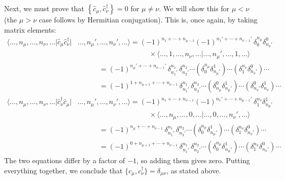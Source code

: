 \documentclass[pra,12pt]{revtex4}
\begin{document}
Next, we must prove that $\left\{ \hat{c}_\mu,
\hat{c}_\nu^\dagger\right\} = 0$ for $\mu \ne \nu$.  We will show this
for $\mu < \nu$ (the $\mu > \nu$ case follows by Hermitian
conjugation).  This is, once again, by taking matrix elements:
$$\begin{aligned}\big\langle \dots,n_\mu,\dots, n_\nu,\dots \big| \hat{c}_\mu \hat{c}_\nu^\dagger \big| & \dots, n_\mu', \dots, n_\nu',\dots\big\rangle = (-1)^{n_1+\cdots+n_{\mu-1}} (-1)^{n_1'+\cdots+n_{\nu-1}'} \,\delta^{n_\mu}_0 \delta^0_{n_\nu'} \\ &\qquad\qquad\qquad\qquad\qquad\times \big\langle \dots, 1, \dots, n_\nu,\dots\big| \dots,n_{\mu}', \dots,1, \dots \big\rangle \\ &\qquad\quad = (-1)^{n_\mu'+\cdots+n_{\nu-1}'}\, \delta^{n_1}_{n_1'} \, \delta^{n_2}_{n_2'} \cdots \left(\delta^{n_\mu}_0\delta^1_{n_\mu'}\right) \cdots \left(\delta^{n_\nu}_1 \delta^0_{n_\nu'}\right) \cdots \\
&\qquad\quad = (-1)^{1 + n_{\mu+1} + \cdots+n_{\nu-1}}\, \delta^{n_1}_{n_1'} \, \delta^{n_2}_{n_2'} \cdots \left(\delta^0_{n_\mu}\delta^1_{n_\mu'}\right) \cdots \left(\delta^0_{n_\nu'} \delta^1_{n_\nu}\right) \cdots \\
  \big\langle \dots,n_\mu,\dots, n_\nu,\dots \big| \hat{c}_\nu^\dagger \hat{c}_\mu \big| &\dots, n_\mu', \dots, n_\nu',\dots\big\rangle = (-1)^{n_1+\cdots+n_{\nu-1}} (-1)^{n_1'+\cdots+n_{\mu-1}'} \,\delta^{n_\nu}_1 \delta^1_{n_\mu'} \\ &\qquad\qquad\qquad\qquad\qquad\times \big\langle \dots, n_\mu, \dots, 0,\dots\big| \dots,0, \dots,n_\nu', \dots \big\rangle \\ &\qquad\quad= (-1)^{n_{\mu}+\cdots+n_{\nu-1}}\, \delta^{n_1}_{n_1'} \, \delta^{n_2}_{n_2'} \cdots \left(\delta^{n_\mu}_0\delta^1_{n_\mu'}\right) \cdots \left(\delta^{n_\nu}_1 \delta^0_{n_\nu'} \right) \cdots \\ &\qquad\quad= (-1)^{0 + n_{\mu+1}+\cdots+n_{\nu-1}}\, \delta^{n_1}_{n_1'} \, \delta^{n_2}_{n_2'} \cdots \left(\delta^{n_\mu}_0\delta^1_{n_\mu'}\right) \cdots \left(\delta^{n_\nu}_1\delta^0_{n_\nu'}\right) \cdots
\end{aligned}$$
The two equations differ by a factor of $-1$, so adding them gives
zero.  Putting everything together, we conclude that
$\big\{c_\mu,c_\nu^\dagger\big\} = \delta_{\mu\nu}$, as stated above.
\end{document}
